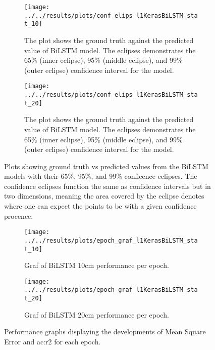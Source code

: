 \begin{figure}
	\begin{subfigure}{0.45\linewidth}
		\centering
		\texttt{[image: ../../results/plots/conf\_elips\_l1KerasBiLSTM\_stat\_10]}
		\caption[Confidence eclipse of BiLSTM model 10cm]{The plot shows the ground truth against the predicted value of BiLSTM model. The eclipses demonstrates the 65\% (inner eclipse), 95\% (middle eclipse), and 99\% (outer eclipse) confidence interval for the model.}
		\label{fig:confelipsl1KerasBiLSTMstat10}
	\end{subfigure}
	\vfill
	\begin{subfigure}{0.45\textwidth}
		\centering
		\texttt{[image: ../../results/plots/conf\_elips\_l1KerasBiLSTM\_stat\_20]}
		\caption[Confidence eclipse of BiLSTM model 20cm]{The plot shows the ground truth against the predicted value of BiLSTM model. The eclipses demonstrates the 65\% (inner eclipse), 95\% (middle eclipse), and 99\% (outer eclipse) confidence interval for the model.}
		\label{fig:confelipsl1KerasBiLSTMstat20}
	\end{subfigure}
	\caption{Plots showing ground truth vs predicted values from the BiLSTM models with their 65\%, 95\%, and 99\% conficence eclipses. The confidence eclipses function the same as confidence intervals but in two dimensions, meaning the area covered by the eclipse denotes where one can expect the points to be with a given confidence procence.}
\end{figure}

\begin{figure}
	\begin{subfigure}{0.45\textwidth}
		\centering
		\begin{adjustwidth}{-1in}{-1in}
			\texttt{[image: ../../results/plots/epoch\_graf\_l1KerasBiLSTM\_stat\_10]}
		\end{adjustwidth}
		\caption[Epoch graph BiLSTM 10cm]{Graf of BiLSTM 10cm performance per epoch.}
		\label{fig:epochgrafl1KerasBiLSTMstat10}
	\end{subfigure}
	\begin{subfigure}{0.45\textwidth}
		\centering
		\begin{adjustwidth}{-1in}{-1in}
			\texttt{[image: ../../results/plots/epoch\_graf\_l1KerasBiLSTM\_stat\_20]}
		\end{adjustwidth}
		\caption[Epoch graph BiLSTM 20cm]{Graf of BiLSTM 20cm performance per epoch.}
		\label{fig:epochgrafl1KerasBiLSTMstat20}
	\end{subfigure}
	\caption{Performance graphs displaying the developments of Mean Square Error and \acrfull{ac:r2} for each epoch.}
\end{figure}

